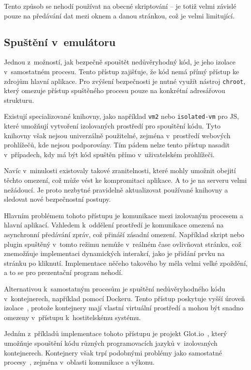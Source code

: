 Tento způsob se nehodí používat na obecné skriptování -- je totiž velmi závislé pouze na předávání dat mezi oknem a danou stránkou, což je velmi limitující.

\subsection{Spuštění v~emulátoru}

Jednou z~možností, jak bezpečně spouštět nedůvěryhodný kód, je jeho izolace v~samostatném procesu. 
Tento přístup zajišťuje, že kód nemá přímý přístup ke zdrojům hlavní aplikace. 
Pro zvýšení bezpečnosti je nutné využít nástroj \texttt{chroot}, který omezuje přístup spuštěného procesu pouze na konkrétní adresářovou strukturu.

Existují specializované knihovny, jako například \texttt{vm2} nebo \texttt{isolated-vm} pro JS, které umožňují vytvoření izolovaných prostředí pro spouštění kódu. 
Tyto knihovny však nejsou univerzálně použitelné, zejména v~prostředí webových prohlížečů, kde nejsou podporovány. 
Tím pádem nelze tento přístup nasadit v~případech, kdy má být kód spuštěn přímo v~uživatelském prohlížeči.

Navíc v~minulosti existovaly takové zranitelnosti, které mohly umožnit obejití těchto omezení, což může vést ke kompromitaci aplikace.
A to je na serveru velmi nežádoucí.
Je proto nezbytné pravidelně aktualizovat používané knihovny a sledovat nové bezpečnostní postupy.

Hlavním problémem tohoto přístupu je komunikace mezi izolovaným procesem a hlavní aplikací. 
Vzhledem k~oddělení prostředí je komunikace omezená na asynchronní předávání zpráv, což přináší zásadní omezení. 
Například skript nebo plugin spuštěný v~tomto režimu nemůže v~reálném čase ovlivňovat stránku, což znemožňuje implementaci dynamických interakcí, jako je přidání prvku na stránku po kliknutí. 
Implementace něčeho takového by měla velmi velké zpoždění, a to se pro prezentační program nehodí.

Alternativou k~samostatným procesům je spuštění nedůvěryhodného kódu v~kontejnerech, například pomocí Dockeru. 
Tento přístup poskytuje vyšší úroveň izolace~\cite{docker}, protože kontejnery mají vlastní virtuální prostředí a mohou být snadno omezeny v~přístupu k~hostitelskému systému.

Jedním z~příkladů implementace tohoto přístupu je projekt Glot.io~\cite{glotio}, který umožňuje spouštění kódu různých programovacích jazyků v~izolovaných kontejnerech. 
Kontejnery však trpí podobnými problémy jako samostatné procesy~\cite{glotio}, zejména v~oblasti komunikace a výkonu. 

